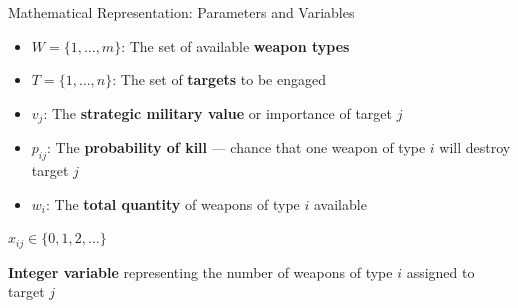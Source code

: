 \documentclass[aspectratio=169,10pt]{beamer}
\begin{document}
\begin{frame}{Mathematical Representation: Parameters and Variables}


  \vspace{0.2cm}
  {\footnotesize
  \begin{itemize}
    \setlength\itemsep{4pt}
    \item[\color{goldaccent}$\blacktriangleright$]
      $W = \{1,\ldots,m\}$: The set of available \textbf{weapon types}
    \item[\color{goldaccent}$\blacktriangleright$]
      $T = \{1,\ldots,n\}$: The set of \textbf{targets} to be engaged
    \item[\color{goldaccent}$\blacktriangleright$]
      $v_j$: The \textbf{strategic military value} or importance of target $j$
    \item[\color{goldaccent}$\blacktriangleright$]
      $p_{ij}$: The \textbf{probability of kill} — chance that one weapon of type $i$ will destroy target $j$
    \item[\color{goldaccent}$\blacktriangleright$]
      $w_i$: The \textbf{total quantity} of weapons of type $i$ available
  \end{itemize}
  }

  \vspace{0.3cm}


  \vspace{0.3cm}

  \begin{center}
    {\large $x_{ij} \in \{0, 1, 2, \ldots\}$}
  \end{center}

  \vspace{0.15cm}
  {\footnotesize
  \textbf{Integer variable} representing the number of weapons of type $i$ assigned to target $j$
  }

\end{frame}
\end{document}
